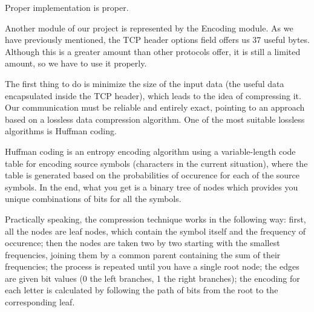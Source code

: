 
Proper implementation is proper.

Another module of our project is represented by the Encoding module. As we
have previously mentioned, the TCP header options field offers us 37 useful
bytes. Although this is a greater amount than other protocols offer, it is
still a limited amount, so we have to use it properly.

The first thing to do is minimize the size of the input data (the useful
data encapsulated inside the TCP header), which leads to the idea of compressing
it. Our communication must be reliable and entirely exact, pointing to an
approach based on a lossless data compression algorithm. One of the most
suitable lossless algorithms is Huffman coding.

Huffman coding\cite{huffman1952method} is an entropy encoding algorithm using
a variable-length code table for encoding source symbols (characters in the
current situation), where the table is generated based on the probabilities of
occurence for each of the source symbols. In the end, what you get is a binary
tree of nodes which provides you unique combinations of bits for all the
symbols.

Practically speaking, the compression technique works in the following way:
first, all the nodes are leaf nodes, which contain the symbol itself and the
frequency of occurence; then the nodes are taken two by two starting with the
smallest frequencies, joining them by a common parent containing the sum of
their frequencies; the process is repeated until you have a single root node;
the edges are given bit values (0 the left branches, 1 the right branches);
the encoding for each letter is calculated by following the path of bits from
the root to the corresponding leaf.

